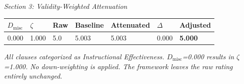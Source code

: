 \documentclass{article}
\begin{document}
\vspace{0.8em}
\noindent\textit{Section 3: Validity-Weighted Attenuation}

\vspace{0.3em}
\noindent
\begin{tabular}{p{2cm} p{2cm} p{2cm} p{2.5cm} p{2.5cm} p{2cm} p{2.5cm}}
\toprule
$D_{\text{misc}}$ & $\zeta$ & \textbf{Raw} & \textbf{Baseline} & \textbf{Attenuated} & $\Delta$ & \textbf{Adjusted} \\
\midrule
0.000 & 1.000 & 5.0 & 5.003 & 5.003 & 0.000 & \textbf{5.000} \\
\bottomrule
\end{tabular}

\vspace{0.5em}
\small\textit{All clauses categorized as Instructional Effectiveness. $D_{\text{misc}}$=0.000 results in $\zeta$=1.000. No down-weighting is applied. The framework leaves the raw rating entirely unchanged.}
\end{document}

